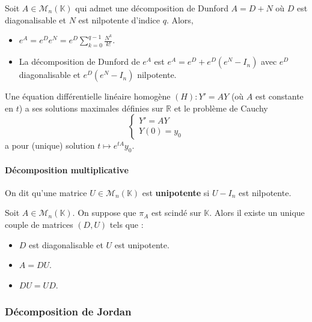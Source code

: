 	\begin{example}
		Soit $A \in \mathcal{M}_n(\mathbb{K})$ qui admet une décomposition de Dunford $A = D+N$ où $D$ est diagonalisable et $N$ est nilpotente d'indice $q$. Alors,
		\begin{itemize}
			\item $e^A = e^D e^N = e^D \sum_{k=0}^{q-1} \frac{N^k}{k!}$.
			\item La décomposition de Dunford de $e^A$ est $e^A = e^D + e^D(e^N - I_n)$ avec $e^D$ diagonalisable et $e^D(e^N - I_n)$ nilpotente.
		\end{itemize}
	\end{example}
	
	
	\begin{application}
		Une équation différentielle linéaire homogène $(H) : Y' = AY$ (où $A$ est constante en $t$) a ses solutions maximales définies sur $\mathbb{R}$ et le problème de Cauchy
		\[ \begin{cases} Y' = AY \\ Y(0) = y_0 \end{cases} \]
		a pour (unique) solution $t \mapsto e^{tA} y_0$.
	\end{application}
	
	\paragraph{Décomposition multiplicative}
	
	
	\begin{definition}
		On dit qu'une matrice $U \in \mathcal{M}_n(\mathbb{K})$ est \textbf{unipotente} si $U - I_n$ est nilpotente.
	\end{definition}
	
	\begin{theorem}
		Soit $A \in \mathcal{M}_n(\mathbb{K})$. On suppose que $\pi_A$ est scindé sur $\mathbb{K}$. Alors il existe un unique couple de matrices $(D, U)$ tels que :
		\begin{itemize}
			\item $D$ est diagonalisable et $U$ est unipotente.
			\item $A = DU$.
			\item $DU = UD$.
		\end{itemize}
	\end{theorem}
		
	\subsubsection{Décomposition de Jordan}
	
